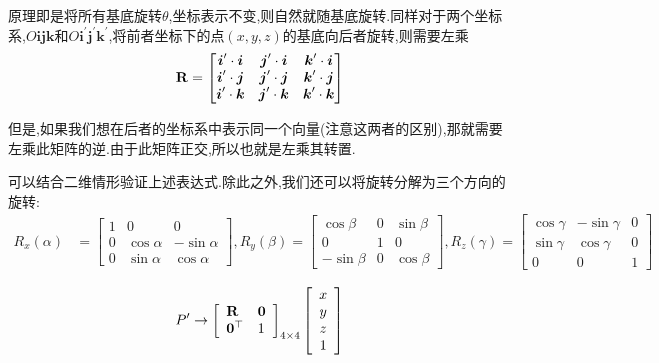 原理即是将所有基底旋转$\theta$,坐标表示不变,则自然就随基底旋转.同样对于两个坐标系,$O\bm i \bm j \bm k$和$O \bm i^\prime \bm j^\prime \bm k^\prime$,将前者坐标下的点$(x, y, z)$的基底向后者旋转,则需要左乘
\begin{equation}
	\bold{R} = \begin{bmatrix}
		\boldsymbol i^\prime \cdot \boldsymbol i  & \boldsymbol j^\prime \cdot \boldsymbol i & \boldsymbol k^\prime \cdot \boldsymbol i
		\\
		\boldsymbol i^\prime \cdot \boldsymbol j  & \boldsymbol j^\prime \cdot \boldsymbol j & \boldsymbol k^\prime \cdot \boldsymbol j
		\\
		\boldsymbol i^\prime \cdot \boldsymbol k  & \boldsymbol j^\prime \cdot \boldsymbol k & \boldsymbol k^\prime \cdot \boldsymbol k
	\end{bmatrix}
\end{equation}

但是,如果我们想在后者的坐标系中表示同一个向量(注意这两者的区别),那就需要左乘此矩阵的逆.由于此矩阵正交,所以也就是左乘其转置.

可以结合二维情形验证上述表达式.除此之外,我们还可以将旋转分解为三个方向的旋转:
\begin{equation}
	\begin{aligned}
		R_{x}(\alpha) &=\left[\begin{array}{ccc}
			1 & 0 & 0 \\
			0 & \cos \alpha & -\sin \alpha \\
			0 & \sin \alpha & \cos \alpha
		\end{array}\right],
		R_{y}(\beta) =\left[\begin{array}{ccc}
			\cos \beta & 0 & \sin \beta \\
			0 & 1 & 0 \\
			-\sin \beta & 0 & \cos \beta
		\end{array}\right],
		R_{z}(\gamma)= {\left[\begin{array}{lll}
				\cos \gamma & -\sin \gamma & 0 \\
				\sin \gamma & \cos \gamma & 0 \\
				0 & 0 & 1
			\end{array}\right] }
	\end{aligned}
\end{equation}

\begin{equation}
	P^{\prime} \rightarrow\left[\begin{array}{ll}
		\bold{R} & \bold{0} \\
		\bold{0}^\top & 1
	\end{array}\right]_{4 \times 4}\left[\begin{array}{c}
		x \\
		y \\
		z \\
		1
	\end{array}\right]
\end{equation}

